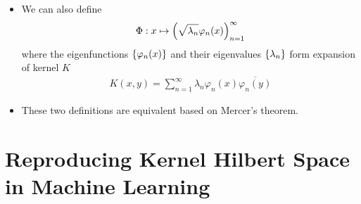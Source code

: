 \documentclass[11pt]{article}
\begin{document}
\begin{enumerate}
\begin{itemize}
\item We can also define
\begin{align*}
\Phi: x \mapsto \left(\sqrt{\lambda_{n}}\varphi_{n}(x)\right)_{n=1}^{\infty}
\end{align*} where the eigenfunctions $\left\{\varphi_n(x)\right\}$ and their eigenvalues $\left\{\lambda_n\right\}$ form expansion of kernel $K$
\begin{align*}
K(x,y) = \sum_{n=1}^{\infty}\lambda_{n}\varphi_n(x)\overline{\varphi_n(y)}
\end{align*}

\item These two definitions are equivalent based on Mercer's theorem.
\end{itemize}

\end{enumerate}
\section{Reproducing Kernel Hilbert Space in Machine Learning}
\end{document}
